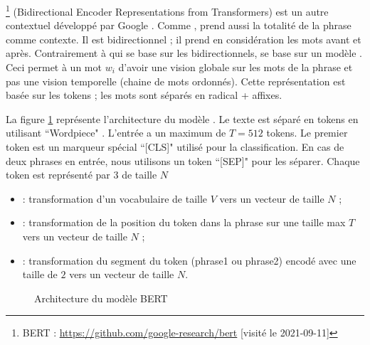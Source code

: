 \documentclass{KodeBook}
\begin{document}
\footnote{BERT : \url{https://github.com/google-research/bert} [visité le 2021-09-11]} (Bidirectional Encoder Representations from Transformers) est un autre  contextuel développé par Google \cite{2019-devlin-al}.
Comme ,  prend aussi la totalité de la phrase comme contexte. 
Il est bidirectionnel ; il prend en considération les mots avant et après.
Contrairement à  qui se base sur les  bidirectionnels,  se base sur un modèle  \cite{2017-vaswani-al}. 
Ceci permet à un mot $w_i$ d'avoir une vision globale sur les mots de la phrase et pas une vision temporelle (chaine de mots ordonnés). 
Cette représentation est basée sur les tokens ; les mots sont séparés en radical + affixes.  


La figure \ref{fig:bert-arch} représente l'architecture du modèle .
Le texte est séparé en tokens en utilisant ``Wordpiece" \cite{2016-wu-al}.
L'entrée a un maximum de $T = 512$ tokens.
Le premier token est un marqueur spécial ``[CLS]" utilisé pour la classification.
En cas de deux phrases en entrée, nous utilisons un token ``[SEP]" pour les séparer. 
Chaque token est représenté par 3  de taille $N$ 
\begin{itemize}
	\item {} : transformation d'un vocabulaire de taille $V$ vers un vecteur de taille $N$ ;
	\item {} : transformation de la position du token dans la phrase sur une taille max $T$ vers un vecteur de taille $N$ ;
	\item {} : transformation du segment du token (phrase1 ou phrase2) encodé avec une taille de $2$ vers un vecteur de taille $N$.
\end{itemize}

\begin{figure}[ht]
	\centering
	\caption{Architecture du modèle BERT}
	\label{fig:bert-arch}
\end{figure}
\end{document}
